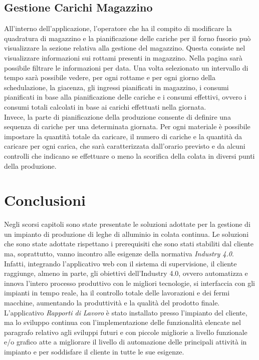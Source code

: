   \subsection{Gestione Carichi Magazzino} 
  All'interno dell'applicazione, l'operatore che ha il compito di modificare la quadratura di magazzino e la pianificazione
  delle cariche per il forno fusorio può visualizzare la sezione relativa alla gestione del magazzino. Questa 
  consiste nel visualizzare informazioni sui rottami presenti
  in magazzino. Nella pagina sarà possibile filtrare le informazioni per data. Una volta selezionato un intervallo di tempo
  sarà possibile vedere, per ogni rottame e per ogni giorno della schedulazione, la giacenza, gli ingressi pianificati in
  magazzino, i consumi pianificati in base alla pianificazione delle cariche e i consumi effettivi, ovvero i consumi totali
  calcolati in base ai carichi effettuati nella giornata.\\
  Invece, la parte di pianificazione della produzione consente di definire una sequenza di cariche per una determinata giornata.
  Per ogni materiale è possibile impostare la quantità totale da caricare, il numero di cariche e la quantità da caricare per
  ogni carica, che sarà caratterizzata dall'orario previsto e da alcuni controlli che indicano se effettuare o meno
  la scorifica della colata in diversi punti della produzione.

  \section{Conclusioni}
  Negli scorsi capitoli sono state presentate le soluzioni adottate per la gestione di un impianto di produzione di leghe
  di alluminio in colata continua. Le soluzioni che sono state adottate rispettano i prerequisiti che sono stati stabiliti dal
  cliente ma, soprattutto, vanno incontro alle esigenze della normativa \textit{Industry 4.0}. Infatti, integrando l'applicativo
  web con il sistema di supervisione, il cliente raggiunge, almeno in parte, gli obiettivi dell'Industry 4.0, ovvero
  automatizza e innova l'intero processo produttivo con le migliori tecnologie, si interfaccia con gli impianti in 
  tempo reale, ha il controllo totale delle lavorazioni e dei fermi macchine, aumentando la produttività e la qualità
  del prodotto finale.\\
  L'applicativo \textit{Rapporti di Lavoro} è stato installato presso l'impianto del cliente, ma lo sviluppo continua con
  l'implementazione delle funzionalità elencate nel paragrafo relativo agli sviluppi futuri e con piccole migliorie a
  livello funzionale e/o grafico atte a migliorare il livello di automazione delle principali attività in impianto
  e per soddisfare il cliente in tutte le sue esigenze.